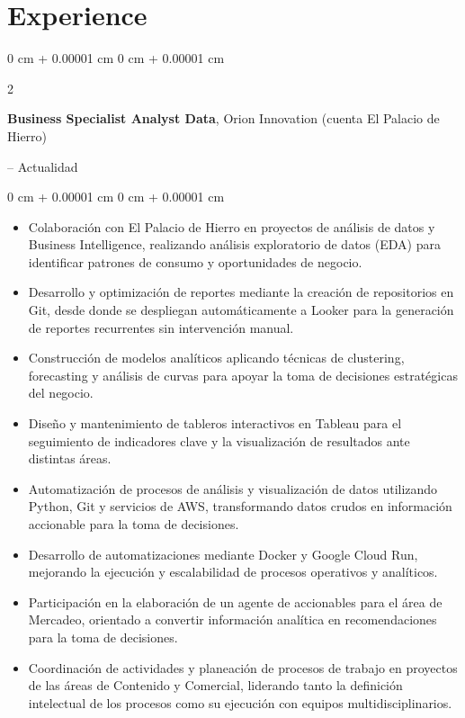 \documentclass[10pt, letterpaper]{article}
\newenvironment{highlights}{
    \begin{itemize}[
        topsep=0.10 cm,
        parsep=0.10 cm,
        partopsep=0pt,
        itemsep=0pt,
        leftmargin=0 cm + 10pt
    ]
}{
    \end{itemize}
} %
\newenvironment{onecolentry}{
    \begin{adjustwidth}{
        0 cm + 0.00001 cm
    }{
        0 cm + 0.00001 cm
    }
}{
    \end{adjustwidth}
} %
\newenvironment{twocolentry}[2][]{
    \onecolentry
    \def\secondColumn{#2}
    \setcolumnwidth{\fill, 4.5 cm}
    \begin{paracol}{2}
}{
    \switchcolumn \raggedleft \secondColumn
    \end{paracol}
    \endonecolentry
} %
\begin{document}
    \section{Experience}
    \begin{twocolentry}{
    2026 -- Actualidad
}

\textbf{Business Specialist Analyst Data}, Orion Innovation (cuenta El Palacio de Hierro)
\end{twocolentry}
\vspace{0.10 cm}
\begin{onecolentry}
    \begin{highlights}
        \item Colaboración con El Palacio de Hierro en proyectos de análisis de datos y Business Intelligence, realizando análisis exploratorio de datos (EDA) para identificar patrones de consumo y oportunidades de negocio.

        \item Desarrollo y optimización de reportes mediante la creación de repositorios en Git, desde donde se despliegan automáticamente a Looker para la generación de reportes recurrentes sin intervención manual.

        \item Construcción de modelos analíticos aplicando técnicas de clustering, forecasting y análisis de curvas para apoyar la toma de decisiones estratégicas del negocio.

        \item Diseño y mantenimiento de tableros interactivos en Tableau para el seguimiento de indicadores clave y la visualización de resultados ante distintas áreas.

        \item Automatización de procesos de análisis y visualización de datos utilizando Python, Git y servicios de AWS, transformando datos crudos en información accionable para la toma de decisiones.

        \item Desarrollo de automatizaciones mediante Docker y Google Cloud Run, mejorando la ejecución y escalabilidad de procesos operativos y analíticos.

        \item Participación en la elaboración de un agente de accionables para el área de Mercadeo, orientado a convertir información analítica en recomendaciones para la toma de decisiones.

        \item Coordinación de actividades y planeación de procesos de trabajo en proyectos de las áreas de Contenido y Comercial, liderando tanto la definición intelectual de los procesos como su ejecución con equipos multidisciplinarios.


\end{highlights}
\end{onecolentry}
\end{document}
